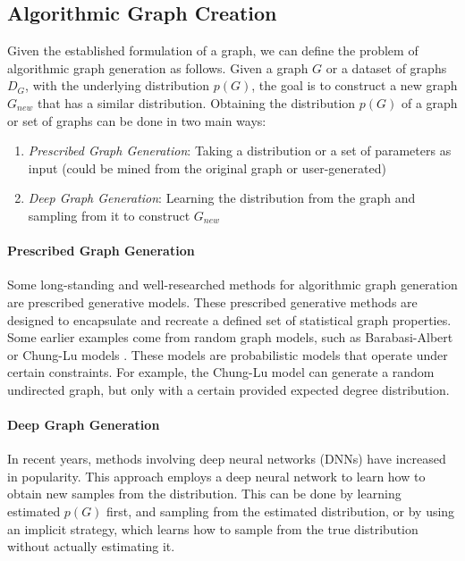 \documentclass{article}
\begin{document}
\subsection{Algorithmic Graph Creation}

Given the established formulation of a graph, we can define the problem of algorithmic graph generation as follows. Given a graph $G$ or a dataset of graphs $D_G$, with the underlying distribution $p(G)$, the goal is to construct a new graph $G_{new}$ that has a similar distribution. Obtaining the distribution $p(G)$ of a graph or set of graphs can be done in two main ways: \begin{enumerate}
  \setlength\itemsep{0.1em}
  \item \emph{Prescribed Graph Generation}: Taking a distribution or a set of parameters as input (could be mined from the original graph or user-generated)
  \item \emph{Deep Graph Generation}: Learning the distribution from the graph and sampling from it to construct $G_{new}$
\end{enumerate}

\paragraph{Prescribed Graph Generation} 

Some long-standing and well-researched methods for algorithmic graph generation are prescribed generative models. These prescribed generative methods are designed to encapsulate and recreate a defined set of statistical graph properties. Some earlier examples come from random graph models, such as Barabasi-Albert \cite{barabasi-albert} or Chung-Lu models \cite{chunglu}. These models are probabilistic models that operate under certain constraints. For example, the Chung-Lu model can generate a random undirected graph, but only with a certain provided expected degree distribution. 

\paragraph{Deep Graph Generation}

In recent years, methods involving deep neural networks (DNNs) have increased in popularity. This approach employs a deep neural network to learn how to obtain new samples from the distribution. This can be done by learning  estimated $p(G)$ first, and sampling from the estimated distribution, or by using an implicit strategy, which learns how to sample from the true distribution without actually estimating it. 
\end{document}
